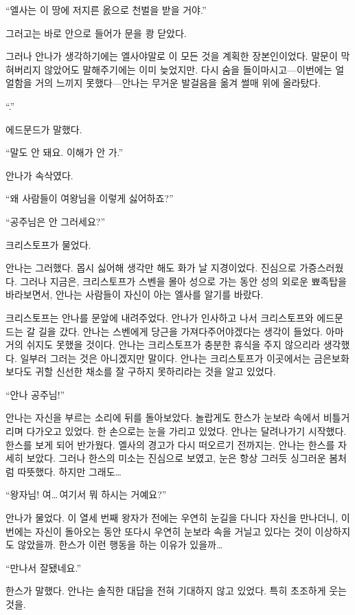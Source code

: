 ``엘사는 이 땅에 저지른 옰으로 천벌을 받을 거야.''

그러고는 바로 안으로 들어가 문을 쾅 닫았다.

그러나 안나가 생각하기에는 엘사야말로 이 모든 것을 계획한 장본인이었다. 말문이 막혀버리지 않았어도 말해주기에는 이미 늦었지만. 다시 숨을 들이마시고—이번에는 얼얼함을 거의 느끼지 못했다—안나는 무거운 발걸음을 옮겨 썰매 위에 올라탔다.

``.''

에드문드가 말했다.

``말도 안 돼요. 이해가 안 가.''

안나가 속삭였다.

``왜 사람들이 여왕님을 이렇게 싫어하죠?''

``공주님은 안 그러세요?''

크리스토프가 물었다.

안나는 그러했다. 몹시 싫어해 생각만 해도 화가 날 지경이었다. 진심으로 가증스러웠다. 그러나 지금은, 크리스토프가 스벤을 몰아 성으로 가는 동안 성의 외로운 뾰족탑을 바라보면서, 안나는 사람들이 자신이 아는 엘사를 알기를 바랐다.

\textbreak

크리스토프는 안나를 문앞에 내려주었다. 안나가 인사하고 나서 크리스토프와 에드문드는 갈 길을 갔다. 안나는 스벤에게 당근을 가져다주어야겠다는 생각이 들었다. 아마 거의 쉬지도 못했을 것이다. 안나는 크리스토프가 충분한 휴식을 주지 않으리라 생각했다. 일부러 그러는 것은 아니겠지만 말이다. 안나는 크리스토프가 이곳에서는 금은보화보다도 귀할 신선한 채소를 잘 구하지 못하리라는 것을 알고 있었다.

``안나 공주님!''

안나는 자신을 부르는 소리에 뒤를 돌아보았다. 놀랍게도 한스가 눈보라 속에서 비틀거리며 다가오고 있었다. 한 손으로는 눈을 가리고 있었다. 안나는 달려나가기 시작했다. 한스를 보게 되어 반가웠다. 엘사의 경고가 다시 떠오르기 전까지는. 안나는 한스를 자세히 보았다. 그러나 한스의 미소는 진심으로 보였고, 눈은 항상 그러듯 싱그러운 봄처럼 따뜻했다. 하지만 그래도\ldots

``왕자님! 여\ldots\,여기서 뭐 하시는 거예요?''

안나가 물었다. 이 열세 번째 왕자가 전에는 우연히 눈길을 다니다 자신을 만나더니, 이번에는 자신이 돌아오는 동안 또다시 우연히 눈보라 속을 거닐고 있다는 것이 이상하지도 않았을까. 한스가 이런 행동을 하는 이유가 있을까\ldots

``만나서 잘됐네요.''

한스가 말했다. 안나는 솔직한 대답을 전혀 기대하지 않고 있었다. 특히 초조하게 웃는 것을.

